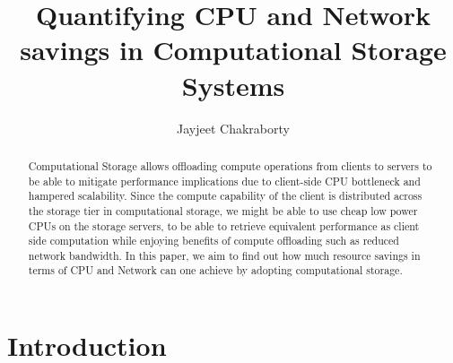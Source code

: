 \documentclass[12pt]{article}
\title{Quantifying CPU and Network savings in Computational Storage Systems}
\author{Jayjeet Chakraborty}
\begin{document}
\maketitle

\begin{abstract}
Computational Storage allows offloading compute operations from clients to servers to be able to mitigate performance implications due to client-side CPU bottleneck and hampered scalability. Since the compute capability of the client is distributed across the storage tier in computational storage, we might be able to use cheap low power CPUs on the storage servers, to be able to retrieve equivalent performance as client side computation while enjoying benefits of compute offloading such as reduced network bandwidth. In this paper, we aim to find out how much resource savings in terms of CPU and Network can one achieve by adopting computational storage. 
\end{abstract}

\section{Introduction}
\end{document}
